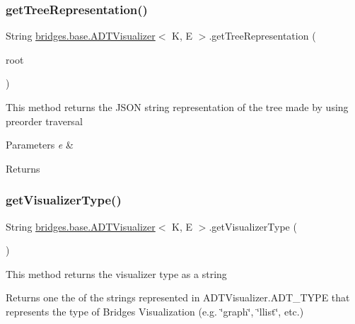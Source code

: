 \subsubsection{\texorpdfstring{get\+Tree\+Representation()}{getTreeRepresentation()}}
{\footnotesize\ttfamily String \hyperlink{classbridges_1_1base_1_1_a_d_t_visualizer}{bridges.\+base.\+A\+D\+T\+Visualizer}$<$ K, E $>$.get\+Tree\+Representation (\begin{DoxyParamCaption}\item[{\hyperlink{classbridges_1_1base_1_1_tree_element}{Tree\+Element}$<$ E $>$}]{root }\end{DoxyParamCaption})}

This method returns the J\+S\+ON string representation of the tree made by using preorder traversal 
\begin{DoxyParams}{Parameters}
{\em e} & \\
\hline
\end{DoxyParams}
\begin{DoxyReturn}{Returns}

\end{DoxyReturn}
\hypertarget{classbridges_1_1base_1_1_a_d_t_visualizer_aea37161ff4b74fbeae6f478b4c2e1a50}{}\label{classbridges_1_1base_1_1_a_d_t_visualizer_aea37161ff4b74fbeae6f478b4c2e1a50} 
\subsubsection{\texorpdfstring{get\+Visualizer\+Type()}{getVisualizerType()}}
{\footnotesize\ttfamily String \hyperlink{classbridges_1_1base_1_1_a_d_t_visualizer}{bridges.\+base.\+A\+D\+T\+Visualizer}$<$ K, E $>$.get\+Visualizer\+Type (\begin{DoxyParamCaption}{ }\end{DoxyParamCaption})}

This method returns the visualizer type as a string \begin{DoxyReturn}{Returns}
one the of the strings represented in A\+D\+T\+Visualizer.\+A\+D\+T\+\_\+\+T\+Y\+PE that represents the type of Bridges Visualization (e.\+g. \char`\"{}graph\char`\"{}, \char`\"{}llist\char`\"{}, etc.) 
\end{DoxyReturn}
\hypertarget{classbridges_1_1base_1_1_a_d_t_visualizer_ab00d1c82e11326ce68c0146bc393c4b1}{}\label{classbridges_1_1base_1_1_a_d_t_visualizer_ab00d1c82e11326ce68c0146bc393c4b1} 
